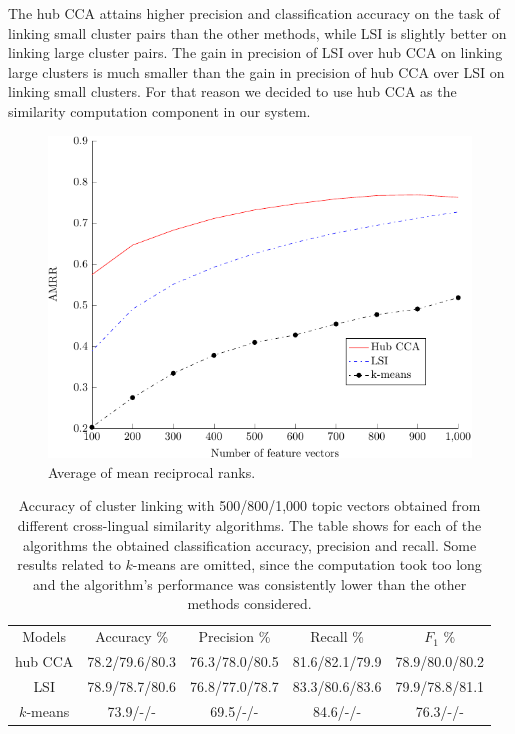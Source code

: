The hub CCA attains higher precision and classification accuracy on the task of linking
small cluster pairs than the other methods, while LSI is slightly better on linking large
cluster pairs. The gain in precision of LSI over hub CCA on linking large clusters is much
smaller than the gain in precision of hub CCA over LSI on linking small clusters. For that
reason we decided to use hub CCA as the similarity computation component in our system.

\begin{figure}
\centering
\includegraphics{figures/retrieval.pdf}
\caption{Average of mean reciprocal ranks.}
\label{pic:AMRR}
\end{figure}

\begin{table}[t]
\caption[Accuracy of cluster linking for several cross-lingual similarity models]{Accuracy of cluster linking with 500/800/1,000 topic vectors obtained from
different cross-lingual similarity algorithms. The table shows for each of the algorithms
the obtained classification accuracy, precision and recall. Some results related to $k$-means
are omitted, since the computation took too long and the algorithm's performance was consistently
lower than the other methods considered.}
\begin{center}
\begin{tabular}{|c|c|c|c|c|}
  \hline
  \cline{1-5}
  Models & Accuracy \% & Precision \% & Recall \% & $F_1$ \% \\ \cline{1-5}
  hub CCA  & 78.2/79.6/80.3 & 76.3/78.0/80.5  & 81.6/82.1/79.9 & 78.9/80.0/80.2
  \\ \cline{1-5}
  LSI      & 78.9/78.7/80.6  & 76.8/77.0/78.7 & 83.3/80.6/83.6 & 79.9/78.8/81.1  \\ \cline{1-5}
 $k$-means & 73.9/-/- & 69.5/-/- & 84.6/-/- &  76.3/-/- \\ \cline{1-5}
\end{tabular}
\end{center}
\label{table:linkingEvalAlgos}
\end{table}

